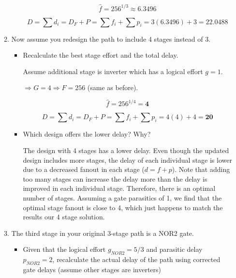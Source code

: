 \documentclass[fleqn]{article}
\begin{document}
\begin{enumerate}
\begin{enumerate}
\begin{itemize}
				\begin{equation*}
					\hat{f} = 256^{1/3} \approx \mathbf{6.3496}
				\end{equation*}
					
				\begin{equation*}
					D = \sum{d_i} = D_F + P = \sum{f_i} + \sum{p_i} = 3(6.3496) + 3 = \mathbf{22.0488}
				\end{equation*}	
					
			\end{itemize}
			
			\item Now assume you redesign the path to include 4 stages instead of 3.
			
			\begin{itemize}
				\item Recalculate the best stage effort and the total delay.
				
					Assume additional stage is inverter which has a logical effort $g = 1$.
					
					$\Rightarrow G = 4 \Rightarrow F = 256$ (same as before).
					
					\begin{equation*}
						\hat{f} = 256^{1/4} = \mathbf{4}
					\end{equation*}
					
					\begin{equation*}
						D = \sum{d_i} = D_F + P = \sum{f_i} + \sum{p_i} = 4(4) + 4 = \mathbf{20}
					\end{equation*}	
				
				\item Which design offers the lower delay? Why?
				
				The design with 4 stages has a lower delay. Even though the updated design includes more stages, the delay of each individual stage is lower due to a decreased fanout in each stage ($d = f + p$). Note that adding too many stages can increase the delay more than the delay is improved in each individual stage. Therefore, there is an optimal number of stages. Assuming a gate parasitics of 1, we find that the optimal stage fanout is close to 4, which just happens to match the results our 4 stage solution.
				
			\end{itemize}
			
			\item The third stage in your original 3-stage path is a NOR2 gate.
			
			\begin{itemize}
				\item Given that the logical effort $g_{NOR2} = 5/3$ and parasitic delay $p_{NOR2} = 2$, recalculate the actual delay of the path using corrected gate delays (assume other stages are inverters)
				

\end{itemize}
\end{enumerate}
\end{enumerate}
\end{document}
